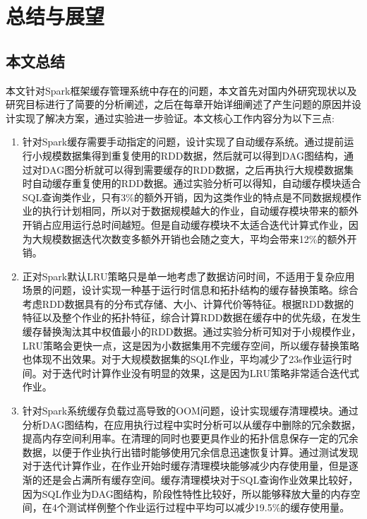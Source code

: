 \chapter{总结与展望}\label{chap:guide}

\section{本文总结}

本文针对Spark框架缓存管理系统中存在的问题，本文首先对国内外研究现状以及研究目标进行了简要的分析阐述，之后在每章开始详细阐述了产生问题的原因并设计实现了解决方案，通过实验进一步验证。本文核心工作内容分为以下三点:

\begin{enumerate}
    \item 针对Spark缓存需要手动指定的问题，设计实现了自动缓存系统。通过提前运行小规模数据集得到重复使用的RDD数据，然后就可以得到DAG图结构，通过对DAG图分析就可以得到需要缓存的RDD数据，之后再执行大规模数据集时自动缓存重复使用的RDD数据。通过实验分析可以得知，自动缓存模块适合SQL查询类作业，只有3\%的额外开销，因为这类作业的特点是不同数据规模作业的执行计划相同，所以对于数据规模越大的作业，自动缓存模块带来的额外开销占应用运行总时间越短。但是自动缓存模块不太适合迭代计算式作业，因为大规模数据迭代次数变多额外开销也会随之变大，平均会带来12\%的额外开销。
    \item 正对Spark默认LRU策略只是单一地考虑了数据访问时间，不适用于复杂应用场景的问题，设计实现一种基于运行时信息和拓扑结构的缓存替换策略。综合考虑RDD数据具有的分布式存储、大小、计算代价等特征。根据RDD数据的特征以及整个作业的拓扑特征，综合计算RDD数据在缓存中的优先级，在发生缓存替换淘汰其中权值最小的RDD数据。通过实验分析可知对于小规模作业，LRU策略会更快一点，这是因为小数据集用不完缓存空间，所以缓存替换策略也体现不出效果。对于大规模数据集的SQL作业，平均减少了23s作业运行时间。对于迭代时计算作业没有明显的效果，这是因为LRU策略非常适合迭代式作业。
    \item 针对Spark系统缓存负载过高导致的OOM问题，设计实现缓存清理模块。通过分析DAG图结构，在应用执行过程中实时分析可以从缓存中删除的冗余数据，提高内存空间利用率。在清理的同时也要更具作业的拓扑信息保存一定的冗余数据，以便于作业执行出错时能够使用冗余信息迅速恢复计算。通过测试发现对于迭代计算作业，在作业开始时缓存清理模块能够减少内存使用量，但是逐渐的还是会占满所有缓存空间。缓存清理模块对于SQL查询作业效果比较好，因为SQL作业为DAG图结构，阶段性特性比较好，所以能够释放大量的内存空间，在4个测试样例整个作业运行过程中平均可以减少19.5\%的缓存使用量。
\end{enumerate}

